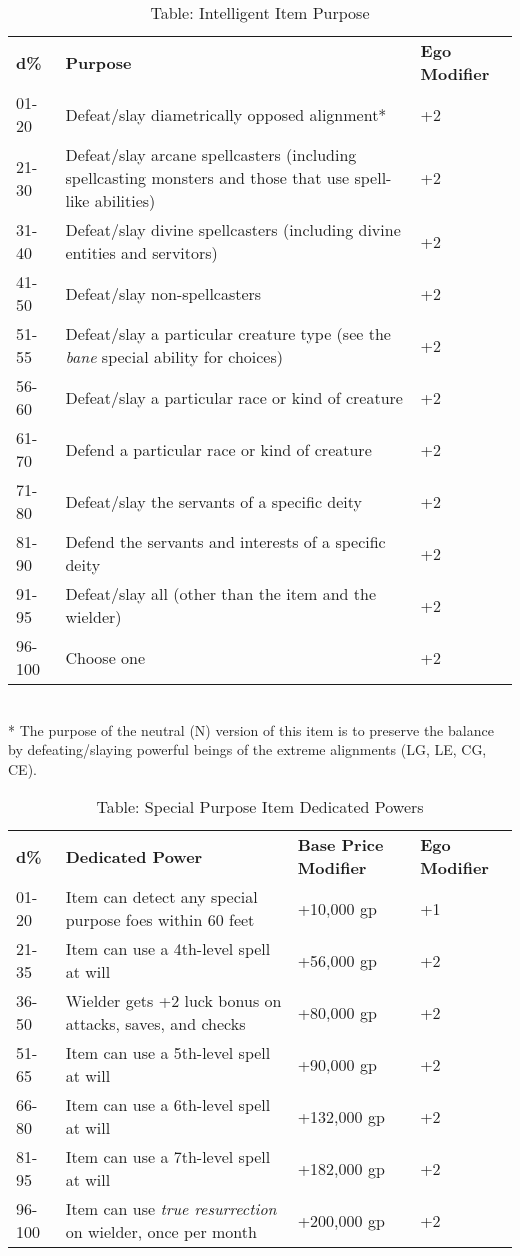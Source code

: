 \begin{table}[]
\sffamily
\caption{Table: Intelligent Item Purpose}
\begin{tabularx}{\linewidth}{lXl}
\textbf{d\%} & \textbf{Purpose} & \textbf{Ego Modifier}\\
01-20 & Defeat/slay diametrically opposed alignment* & +2 \\
 21-30 & Defeat/slay arcane spellcasters (including spellcasting monsters and those that use spell-like abilities) & +2 \\
 31-40 & Defeat/slay divine spellcasters (including divine entities and servitors) & +2 \\
 41-50 & Defeat/slay non-spellcasters & +2 \\
 51-55 & Defeat/slay a particular creature type (see the \textit{bane} special ability for choices)  & +2 \\
 56-60 & Defeat/slay a particular race or kind of creature & +2 \\
 61-70 & Defend a particular race or kind of creature & +2 \\
 71-80 & Defeat/slay the servants of a specific deity & +2 \\
 81-90 & Defend the servants and interests of a specific deity & +2 \\
 91-95 & Defeat/slay all (other than the item and the wielder) & +2 \\
 96-100 & Choose one & +2\\
\end{tabularx}\\
* The purpose of the neutral (N) version of this item is to preserve the balance by defeating/slaying powerful beings of the extreme alignments (LG, LE, CG, CE).\\
\end{table}
\begin{table}[]
\sffamily
\caption{Table: Special Purpose Item Dedicated Powers}
\begin{tabularx}{\linewidth}{lXll}
\textbf{d\%} & \textbf{Dedicated Power} & \textbf{Base Price Modifier} & \textbf{Ego Modifier}\\
01-20 & Item can detect any special purpose foes within 60 feet & +10,000 gp & +1 \\
 21-35 & Item can use a 4th-level spell at will & +56,000 gp & +2 \\
 36-50 & Wielder gets +2 luck bonus on attacks, saves, and checks & +80,000 gp & +2 \\
 51-65 & Item can use a 5th-level spell at will & +90,000 gp & +2 \\
 66-80 & Item can use a 6th-level spell at will & +132,000 gp & +2 \\
 81-95 & Item can use a 7th-level spell at will & +182,000 gp & +2 \\
 96-100 & Item can use \textit{true resurrection }on wielder, once per month  & +200,000 gp & +2\\
\end{tabularx}
\end{table}

